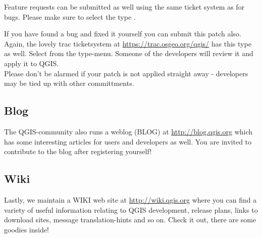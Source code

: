 Feature requests can be submitted as well using the same ticket system as for bugs.
Please make sure to select the type .

If you have found a bug and fixed it yourself you can submit this patch also.
Again, the lovely trac ticketsystem at \url{https://trac.osgeo.org/qgis/} has this 
type as well. Select  from the type-menu. Someone of the 
developers will review it and apply it to QGIS. \\
Please don't be alarmed if your patch is not applied straight away - developers
may be tied up with other committments.


\subsection{Blog}
The QGIS-community also runs a weblog (BLOG) at \url{http://blog.qgis.org} 
which has some interesting articles for users and developers as well. 
You are invited to contribute to the blog after registering yourself!

\subsection{Wiki}
Lastly, we maintain a WIKI web site at \url{http://wiki.qgis.org} where you 
can find a variety of useful information relating to QGIS development, 
release plans, links to download sites, message translation-hints and so on. 
Check it out, there are some goodies inside!

